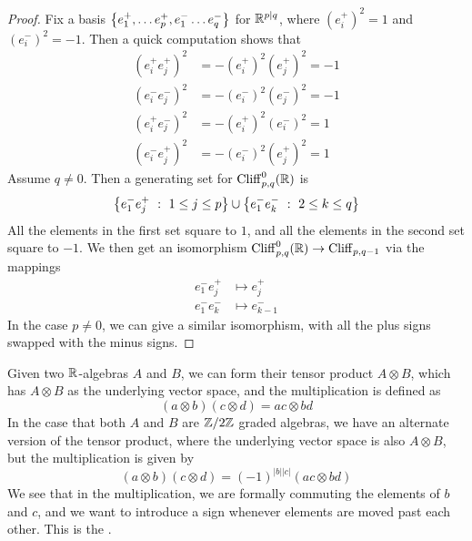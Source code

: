 %
\begin{proof}
Fix a basis $\left\lbrace e_1^+, \ldots e_p^+, e_1^- \ldots e_q^- \right\rbrace$ for $\mathbb{R}^{p|q}$, where
$(e_i^+)^2 = 1$ and $(e_i^-)^2 = -1$. Then a quick computation shows that
%
\begin{align*}
(e_i^+e_j^+)^2 &= -(e_i^+)^2(e_j^+)^2 = -1 \\
(e_i^-e_j^-)^2 &= -(e_i^-)^2(e_j^-)^2 = -1 \\
(e_i^+e_j^-)^2 &= -(e_i^+)^2(e_i^-)^2 = 1 \\
(e_i^-e_j^+)^2 &= -(e_i^-)^2(e_j^+)^2 = 1
\end{align*}
%
Assume $q \neq 0$. Then a generating set for $\operatorname{Cliff}_{p,q}^0(\mathbb{R})$ is
\[
\left\lbrace e_1^-e_j^+ ~:~ 1 \leq j \leq p \right\rbrace \cup \left\lbrace e_1^-e_k^- ~:~ 2 \leq k \leq q \right\rbrace
\]
All the elements in the first set square to $1$, and all the elements in the
second set square to $-1$. We then get an isomorphism
$\operatorname{Cliff}^0_{p,q}(\mathbb{R}) \to \operatorname{Cliff}_{p,q-1}$ via the mappings
\begin{align*}
e_1^-e_j^+ &\mapsto e_j^+ \\
e_1^-e_k^- &\mapsto e_{k-1}^-
\end{align*}
In the case $p \neq 0$, we can give a similar isomorphism, with all the plus
signs swapped with the minus signs.
\end{proof}
%
Given two $\mathbb{R}$-algebras $A$ and $B$, we can form their tensor product
$A \otimes B$, which has $A \otimes B$ as the underlying vector space, and the
multiplication is defined as
\[
(a \otimes b)(c \otimes d) = ac \otimes bd
\]
In the case that both $A$ and $B$ are $\mathbb{Z}/2\mathbb{Z}$ graded algebras, we have an alternate
version of the tensor product, where the underlying vector space is also
$A \otimes B$, but the multiplication is given by
\[
(a \otimes b)(c \otimes d) = (-1)^{|b||c|}(ac \otimes bd)
\]
We see that in the multiplication, we are formally commuting the elements of
$b$ and $c$, and we want to introduce a sign whenever elements are moved past
each other. This is the .
%
